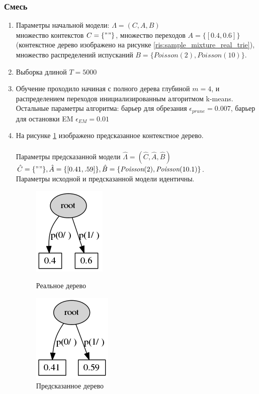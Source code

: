 \documentclass{matmex-diploma-custom}
\begin{document}
\subsubsection{Смесь}
\begin{enumerate}
\item Параметры начальной модели: $\Lambda = (C, A, B)$ 
\\множество контекстов $C = \{""\}$, множество переходов $A = \{[0.4, 0.6]\}$ (контекстное дерево изображено на рисунке \ref{ris:sample_mixture_real_trie}), множество распределений испусканий $B = \{\textit{Poisson}(2), \textit{Poisson}(10)\}$. 
\item Выборка длиной $ T = 5000 $
\item Обучение проходило начиная с полного дерева глубиной $ m  = 4$, и распределением переходов инициализированным алгоритмом k-means. 
\\Остальные параметры алгоритма: барьер для обрезания $ \epsilon_{\textit{prune}} = 0.007$, барьер для остановки EM $ \epsilon_{\textit{EM}} =  0.01 $      
\item  На рисунке \ref{ris:sample_mixture_predicted_trie} изображено предсказанное контекстное дерево. 
\\
\\Параметры предсказанной модели $\hat{\Lambda} = (\hat{C}, \hat{A}, \hat{B})$  
\\$\hat{C} = \{""\}, \hat{A} = \{[0.41, .59]\}, \hat{B} = \{\textit{Poisson}(2), \textit{Poisson}(10.1)\}$.
\\Параметры исходной и предсказанной модели идентичны.
\begin{figure}[h!]\centering
\begin{minipage}[b]{0.49 \textwidth}
	\includegraphics[scale=0.57]{img/sample_mixture/real_trie_.png}
	\centering
	\caption{ Реальное дерево }
	\label{ris:sample_mixture_real_trie}
\end{minipage}
\hfil \hfil%
\begin{minipage}[b]{0.49 \textwidth}
	\includegraphics[scale=0.57]{img/sample_mixture/predicted_trie.png}
	\centering
	\caption{ Предсказанное дерево }
	\label{ris:sample_mixture_predicted_trie}
\end{minipage}
\end{figure}
\end{enumerate}
\end{document}
